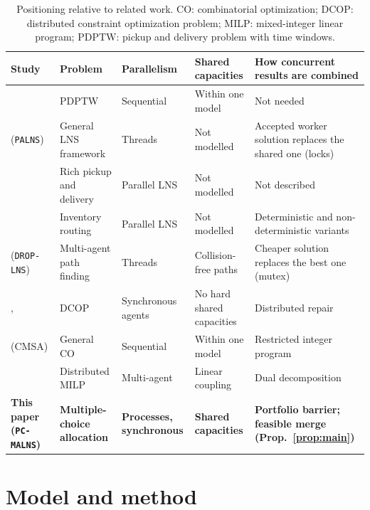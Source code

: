 \documentclass[a4paper,fleqn]{cas-sc}
\newcommand{\pcm}{\texttt{PC-MALNS}}
\begin{document}
\begin{table}[pos=!htb]
\centering
\caption{Positioning relative to related work. CO: combinatorial optimization; DCOP: distributed constraint optimization problem; MILP: mixed-integer linear program; PDPTW: pickup and delivery problem with time windows.}
\label{tab:literature}
\footnotesize
\begin{tabular}{@{}p{3.1cm}p{2.9cm}p{2.8cm}p{2.6cm}p{3.3cm}@{}}
\toprule
\textbf{Study} & \textbf{Problem} & \textbf{Parallelism} & \textbf{Shared capacities} & \textbf{How concurrent results are combined} \\
\midrule
\citet{ropke2006} & PDPTW & Sequential & Within one model & Not needed \\
\citet{ropke2009} (\texttt{PALNS}) & General LNS framework & Threads & Not modelled & Accepted worker solution replaces the shared one (locks) \\
\citet{bartodziej2010} & Rich pickup and delivery & Parallel LNS & Not modelled & Not described \\
\citet{asokan2014} & Inventory routing & Parallel LNS & Not modelled & Deterministic and non-deterministic variants \\
\citet{chan2024} (\texttt{DROP-LNS}) & Multi-agent path finding & Threads & Collision-free paths & Cheaper solution replaces the best one (mutex) \\
\citet{fioretto2017}, \citet{hoang2018} & DCOP & Synchronous agents & No hard shared capacities & Distributed repair \\
\citet{blum2016} (CMSA) & General CO & Sequential & Within one model & Restricted integer program \\
\citet{falsone2017} & Distributed MILP & Multi-agent & Linear coupling & Dual decomposition \\
\textbf{This paper (\pcm)} & \textbf{Multiple-choice allocation} & \textbf{Processes, synchronous} & \textbf{Shared capacities} & \textbf{Portfolio barrier; feasible merge (Prop.~\ref{prop:main})} \\
\bottomrule
\end{tabular}
\end{table}

\section{Model and method}
\label{sec:method}
\end{document}

